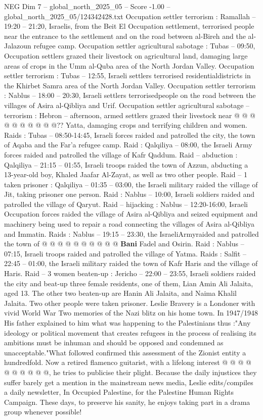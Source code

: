\begin{textsample}{NEG Dim 7 – global\_north\_2025\_05 – Score -1.00 – global\_north\_2025\_05/124342428.txt}
Occupation settler terrorism : Ramallah -- 19:20 -- 21:20, Israelis, from the Beit El Occupation settlement, terrorised people near the entrance to the settlement and on the road between al-Bireh and the al-Jalazoun refugee camp.
Occupation settler agricultural sabotage : Tubas -- 09:50, Occupation settlers grazed their livestock on agricultural land, damaging large areas of crops in the Umm al-Quba area of the North Jordan Valley.
Occupation settler terrorism : Tubas -- 12:55, Israeli settlers terrorised residentialdistricts in the Khirbet Samra area of the North Jordan Valley.
Occupation settler terrorism : Nablus -- 18:00 -- 20:30, Israeli settlers terrorisedpeople on the road between the villages of Asira al-Qibliya and Urif.
Occupation settler agricultural sabotage -- terrorism : Hebron -- afternoon, armed settlers grazed their livestock near @ @ @ @ @ @ @ @ @ @??
Yatta, damaging crops and terrifying children and women.
Raids : Tubas -- 08:50-14:45, Israeli forces raided and patrolled the city, the town of Aqaba and the Far'a refugee camp.
Raid : Qalqiliya -- 08:00, the Israeli Army forces raided and patrolled the village of Kafr Qaddum.
Raid -- abduction : Qalqiliya -- 21:15 -- 01:55, Israeli troops raided the town of Azzun, abducting a 13-year-old boy, Khaled Jaafar Al-Zayat, as well as two other people.
Raid -- 1 taken prisoner : Qalqiliya -- 01:35 -- 03:00, the Israeli military raided the village of Jit, taking prisoner one person.
Raid : Nablus -- 10:00, Israeli soldiers raided and patrolled the village of Qaryut.
Raid -- hijacking : Nablus -- 12:20-16:00, Israeli Occupation forces raided the village of Asira al-Qibliya and seized equipment and machinery being used to repair a road connecting the villages of Asira al-Qibliya and Immatin.
Raids : Nablus -- 19:15 -- 23:30, the IsraeliArmyraided and patrolled the town of @ @ @ @ @ @ @ @ @ @ \textbf{Bani} Fadel and Osirin.
Raid : Nablus -- 07:15, Israeli troops raided and patrolled the village of Yatma.
Raids : Salfit -- 22:45 -- 01:00, the Israeli military raided the town of Kafr Haris and the village of Haris.
Raid -- 3 women beaten-up : Jericho -- 22:00 -- 23:55, Israeli soldiers raided the city and beat-up three female residents, one of them, Lian Amin Ali Jalaita, aged 13.
The other two beaten-up are Hanin Ali Jalaita, and Naima Khalil Jalaita.
Two other people were taken prisoner.
Leslie Bravery is a Londoner with vivid World War Two memories of the Nazi blitz on his home town.
In 1947/1948 His father explained to him what was happening to the Palestinians thus :"Any ideology or political movement that creates refugees in the process of realising its ambitions must be inhuman and should be opposed and condemned as unacceptable."What followed confirmed this assessment of the Zionist entity a hundredfold.
Now a retired flamenco guitarist, with a lifelong interest @ @ @ @ @ @ @ @ @ @, he tries to publicise their plight.
Because the daily injustices they suffer barely get a mention in the mainstream news media, Leslie edits/compiles a daily newsletter, In Occupied Palestine, for the Palestine Human Rights Campaign.
These days, to preserve his sanity, he enjoys taking part in a drama group whenever possible!


\end{textsample}
